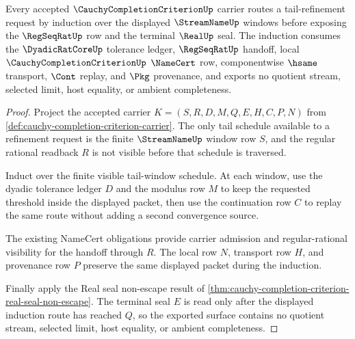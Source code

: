 \begin{theorem}
\label{thm:cauchycompletioncriterion-regular-tail-induction}
Every accepted $\CauchyCompletionCriterionUp$ carrier routes a tail-refinement request by induction over the displayed $\StreamNameUp$ windows before exposing the $\RegSeqRatUp$ row and the terminal $\RealUp$ seal. The induction consumes the $\DyadicRatCoreUp$ tolerance ledger, $\RegSeqRatUp$ handoff, local $\CauchyCompletionCriterionUp$ $\NameCert$ row, componentwise $\hsame$ transport, $\Cont$ replay, and $\Pkg$ provenance, and exports no quotient stream, selected limit, host equality, or ambient completeness.
\end{theorem}
\begin{proof}
Project the accepted carrier $K=(S,R,D,M,Q,E,H,C,P,N)$ from \autoref{def:cauchy-completion-criterion-carrier}. The only tail schedule available to a refinement request is the finite $\StreamNameUp$ window row $S$, and the regular rational readback $R$ is not visible before that schedule is traversed.

Induct over the finite visible tail-window schedule. At each window, use the dyadic tolerance ledger $D$ and the modulus row $M$ to keep the requested threshold inside the displayed packet, then use the continuation row $C$ to replay the same route without adding a second convergence source.

The existing NameCert obligations provide carrier admission and regular-rational visibility for the handoff through $R$. The local row $N$, transport row $H$, and provenance row $P$ preserve the same displayed packet during the induction.

Finally apply the Real seal non-escape result of \autoref{thm:cauchy-completion-criterion-real-seal-non-escape}. The terminal seal $E$ is read only after the displayed induction route has reached $Q$, so the exported surface contains no quotient stream, selected limit, host equality, or ambient completeness.
\end{proof}

